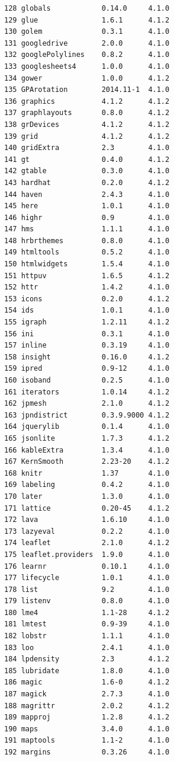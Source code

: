 \documentclass[
  a4paper,
  pandoc,
  ja=standard,
  jafont=haranoaji]{bxjsbook}
\begin{document}
\begin{verbatim}
128 globals            0.14.0     4.1.0
129 glue               1.6.1      4.1.2
130 golem              0.3.1      4.1.0
131 googledrive        2.0.0      4.1.0
132 googlePolylines    0.8.2      4.1.0
133 googlesheets4      1.0.0      4.1.0
134 gower              1.0.0      4.1.2
135 GPArotation        2014.11-1  4.1.0
136 graphics           4.1.2      4.1.2
137 graphlayouts       0.8.0      4.1.2
138 grDevices          4.1.2      4.1.2
139 grid               4.1.2      4.1.2
140 gridExtra          2.3        4.1.0
141 gt                 0.4.0      4.1.2
142 gtable             0.3.0      4.1.0
143 hardhat            0.2.0      4.1.2
144 haven              2.4.3      4.1.0
145 here               1.0.1      4.1.0
146 highr              0.9        4.1.0
147 hms                1.1.1      4.1.0
148 hrbrthemes         0.8.0      4.1.0
149 htmltools          0.5.2      4.1.0
150 htmlwidgets        1.5.4      4.1.0
151 httpuv             1.6.5      4.1.2
152 httr               1.4.2      4.1.0
153 icons              0.2.0      4.1.2
154 ids                1.0.1      4.1.0
155 igraph             1.2.11     4.1.2
156 ini                0.3.1      4.1.0
157 inline             0.3.19     4.1.0
158 insight            0.16.0     4.1.2
159 ipred              0.9-12     4.1.0
160 isoband            0.2.5      4.1.0
161 iterators          1.0.14     4.1.2
162 jpmesh             2.1.0      4.1.2
163 jpndistrict        0.3.9.9000 4.1.2
164 jquerylib          0.1.4      4.1.0
165 jsonlite           1.7.3      4.1.2
166 kableExtra         1.3.4      4.1.0
167 KernSmooth         2.23-20    4.1.2
168 knitr              1.37       4.1.0
169 labeling           0.4.2      4.1.0
170 later              1.3.0      4.1.0
171 lattice            0.20-45    4.1.2
172 lava               1.6.10     4.1.0
173 lazyeval           0.2.2      4.1.0
174 leaflet            2.1.0      4.1.2
175 leaflet.providers  1.9.0      4.1.0
176 learnr             0.10.1     4.1.0
177 lifecycle          1.0.1      4.1.0
178 list               9.2        4.1.0
179 listenv            0.8.0      4.1.0
180 lme4               1.1-28     4.1.2
181 lmtest             0.9-39     4.1.0
182 lobstr             1.1.1      4.1.0
183 loo                2.4.1      4.1.0
184 lpdensity          2.3        4.1.2
185 lubridate          1.8.0      4.1.0
186 magic              1.6-0      4.1.2
187 magick             2.7.3      4.1.0
188 magrittr           2.0.2      4.1.2
189 mapproj            1.2.8      4.1.2
190 maps               3.4.0      4.1.0
191 maptools           1.1-2      4.1.0
192 margins            0.3.26     4.1.0

\end{verbatim}
\end{document}
